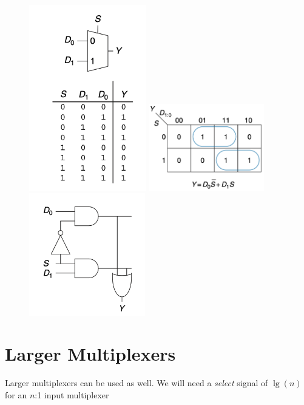 \documentclass[12pt]{report}
\begin{document}
\begin{figure}[h!]
  \centering
  \includegraphics[width=2in]{2-bit-mux.png}
  \includegraphics[width=0.45\textwidth]{mux-kmap.png} %
  \hspace{0.05\textwidth} %
  \includegraphics[width=0.45\textwidth]{mux-implementation.png} %
\end{figure}

\pagebreak

\section{Larger Multiplexers}
Larger multiplexers can be used as well. We will need a \textit{select} signal of $\lg (n)$ for an $n$:1 input multiplexer
\end{document}
